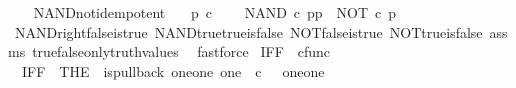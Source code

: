 \begin{isabellebody}
\ \ \isamarkupfalse%
\isanewline
{}\isamarkupfalse%
%
\endisatagproof
{\isafoldproof}%
%
\isadelimproof
\isanewline
%
\endisadelimproof
\isanewline
{}\isamarkupfalse%
\ NAND{\isacharunderscore}{\kern0pt}not{\isacharunderscore}{\kern0pt}idempotent{\isacharcolon}{\kern0pt}\isanewline
\ \ \ {\isachardoublequoteopen}p\ {\isasymin}\isactrlsub c\ {\isasymOmega}{\isachardoublequoteclose}\isanewline
\ \ \ {\isachardoublequoteopen}NAND\ {\isasymcirc}\isactrlsub c\ {\isasymlangle}p{\isacharcomma}{\kern0pt}p{\isasymrangle}\ {\isacharequal}{\kern0pt}\ NOT\ {\isasymcirc}\isactrlsub c\ p{\isachardoublequoteclose}\isanewline
%
\isadelimproof
\ \ %
\endisadelimproof
%
\isatagproof
{}\isamarkupfalse%
\ NAND{\isacharunderscore}{\kern0pt}right{\isacharunderscore}{\kern0pt}false{\isacharunderscore}{\kern0pt}is{\isacharunderscore}{\kern0pt}true\ NAND{\isacharunderscore}{\kern0pt}true{\isacharunderscore}{\kern0pt}true{\isacharunderscore}{\kern0pt}is{\isacharunderscore}{\kern0pt}false\ NOT{\isacharunderscore}{\kern0pt}false{\isacharunderscore}{\kern0pt}is{\isacharunderscore}{\kern0pt}true\ NOT{\isacharunderscore}{\kern0pt}true{\isacharunderscore}{\kern0pt}is{\isacharunderscore}{\kern0pt}false\ assms\ true{\isacharunderscore}{\kern0pt}false{\isacharunderscore}{\kern0pt}only{\isacharunderscore}{\kern0pt}truth{\isacharunderscore}{\kern0pt}values\ \isamarkupfalse%
\ fastforce%
\endisatagproof
{\isafoldproof}%
%
\isadelimproof
%
\endisadelimproof
%
\isadelimdocument
%
\endisadelimdocument
%
\isatagdocument
%
\isamarkuptrue%
%
\endisatagdocument
{\isafolddocument}%
%
\isadelimdocument
%
\endisadelimdocument
{}\isamarkupfalse%
\ IFF\ {\isacharcolon}{\kern0pt}{\isacharcolon}{\kern0pt}\ {\isachardoublequoteopen}cfunc{\isachardoublequoteclose}\ \isanewline
\ \ {\isachardoublequoteopen}IFF\ {\isacharequal}{\kern0pt}\ {\isacharparenleft}{\kern0pt}THE\ {\isasymchi}{\isachardot}{\kern0pt}\ is{\isacharunderscore}{\kern0pt}pullback\ {\isacharparenleft}{\kern0pt}one{\isasymCoprod}one{\isacharparenright}{\kern0pt}\ one\ {\isacharparenleft}{\kern0pt}{\isasymOmega}\ {\isasymtimes}\isactrlsub c\ {\isasymOmega}{\isacharparenright}{\kern0pt}\ {\isasymOmega}\ {\isacharparenleft}{\kern0pt}{\isasymbeta}\isactrlbsub {\isacharparenleft}{\kern0pt}one{\isasymCoprod}one{\isacharparenright}{\kern0pt}\isactrlesub {\isacharparenright}{\kern0pt}\ {\isasymt}\ {\isacharparenleft}{\kern0pt}{\isasymlangle}{\isasymt}{\isacharcomma}{\kern0pt}\ {\isasymt}{\isasymrangle}\ {\isasymamalg}{\isasymlangle}{\isasymf}{\isacharcomma}{\kern0pt}\ {\isasymf}{\isasymrangle}{\isacharparenright}{\kern0pt}\ {\isasymchi}{\isacharparenright}{\kern0pt}{\isachardoublequoteclose}\isanewline

\end{isabellebody}

